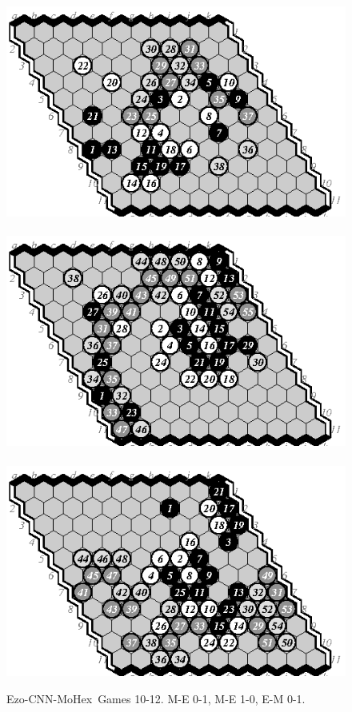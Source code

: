 \documentclass{IOS-Book-Article}
\newif\iflong\longtrue  %
\def\Ec{\mbox{\sc Ezo-CNN}}
\def\Mx{\mbox{\sc MoHex}}
\begin{document}
\begin{figure}
\hspace*{-2cm}\
\includegraphics[scale=1]{pix/11.me10plus.eps}\hspace*{-1.5cm}\
\includegraphics[scale=1]{pix/11.me11plus.eps}\hspace*{-1.5cm}\
\includegraphics[scale=1]{pix/11.em12plus.eps}
\caption{\Ec-\Mx\ Games 10-12. M-E 0-1, M-E 1-0, E-M 0-1.}
\end{figure}
\iflong
\end{document}
